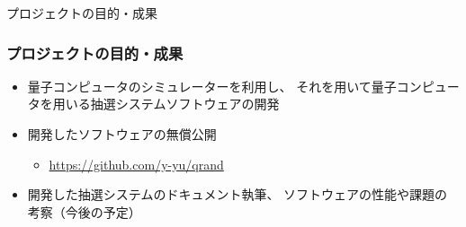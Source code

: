 \begin{frame}
  \centering
  {\Huge プロジェクトの目的・成果}
\end{frame}

\begin{frame}
  \frametitle{プロジェクトの目的・成果}

  \pause
  \begin{itemize}
    \item<+-> 量子コンピュータのシミュレーターを利用し、
    それを用いて量子コンピュータを用いる抽選システムソフトウェアの開発

    \item<+-> 開発したソフトウェアの無償公開
    \begin{itemize}
      \item \url{https://github.com/y-yu/qrand}
    \end{itemize}

    \item<+-> 開発した抽選システムのドキュメント執筆、
    ソフトウェアの性能や課題の考察（今後の予定）
  \end{itemize}
\end{frame}

